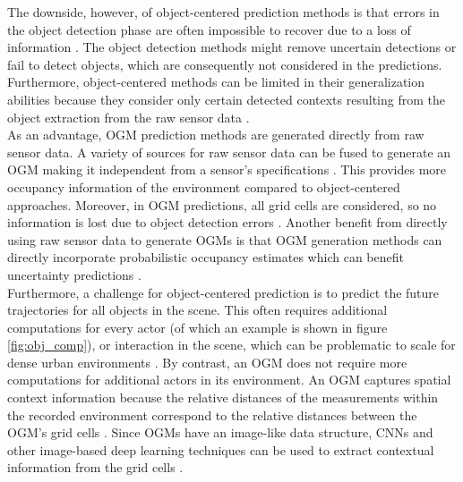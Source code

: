 The downside, however, of object-centered prediction methods is that errors in the object detection phase are often impossible to recover due to a loss of information \cite{li2020end}. The object detection methods might remove uncertain detections or fail to detect objects, which are consequently not considered in the predictions. Furthermore, object-centered methods can be limited in their generalization abilities because they consider only certain detected contexts resulting from the object extraction from the raw sensor data \cite{itkina2019dynamic}. \\

As an advantage, \gls{OGM} prediction methods are generated directly from raw sensor data. A variety of sources for raw sensor data can be fused to generate an \gls{OGM} making it independent from a sensor's specifications \cite{hoermann2018dynamic}. This provides more occupancy information of the environment compared to object-centered approaches. Moreover, in \gls{OGM} predictions, all grid cells are considered, so no information is lost due to object detection errors \cite{wu2020motionnet}. Another benefit from directly using raw sensor data to generate \glspl{OGM} is that \gls{OGM} generation methods can directly incorporate probabilistic occupancy estimates which can benefit uncertainty predictions \cite{hoermann2018dynamic}. \\

Furthermore, a challenge for object-centered prediction is to predict the future trajectories for all objects in the scene. This often requires additional computations for every actor (of which an example is shown in figure \ref{fig:obj_comp}), or interaction in the scene, which can be problematic to scale for dense urban environments \cite{meyer2020laserflow} \cite{zhao2019multi} \cite{ettinger2021large}. By contrast, an \gls{OGM} does not require more computations for additional actors in its environment. An \gls{OGM} captures spatial context information because the relative distances of the measurements within the recorded environment correspond to the relative distances between the \gls{OGM}'s grid cells \cite{hoermann2018dynamic}. Since \glspl{OGM} have an image-like data structure, \glspl{CNN} and other image-based deep learning techniques can be used to extract contextual information from the grid cells \cite{hoermann2018dynamic} \cite{itkina2019dynamic}.  \\

